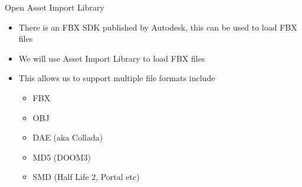 \begin{frame}{Open Asset Import Library}
	\begin{itemize}
		\item There is an FBX SDK published by Autodesk, this can be used to load FBX files
		\pause\item We will use Asset Import Library to load FBX files
		\pause\item This allows us to support multiple file formats include
		\begin{itemize}
			\pause\item FBX
			\pause\item OBJ 
			\pause\item DAE (aka Collada)
			\pause\item MD5 (DOOM3)
			\pause\item SMD (Half Life 2, Portal etc)
		\end{itemize}
	\end{itemize}
\end{frame}
